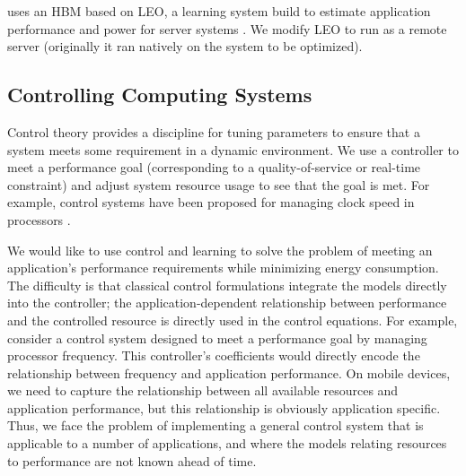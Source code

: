


\SYSTEM{} uses an HBM based on LEO, a learning system build to
estimate application performance and power for server systems
\cite{LEO}.  We modify LEO to run as a remote server (originally it
ran natively on the system to be optimized). 





\subsection{Controlling Computing Systems}

Control theory provides a discipline for tuning parameters to ensure
that a system meets some requirement in a dynamic environment.  We use
a controller to meet a performance goal (corresponding to a
quality-of-service or real-time constraint) and adjust system resource
usage to see that the goal is met.  For example, control systems have
been proposed for managing clock speed in processors \cite{lefurgy}.


We would like to use control and learning to solve the problem of
meeting an application's performance requirements while minimizing
energy consumption.  The difficulty is that classical control
formulations integrate the models directly into the controller; \ie
the application-dependent relationship between performance and the
controlled resource is directly used in the control equations.  For
example, consider a control system designed to meet a performance goal
by managing processor frequency.  This controller's coefficients would
directly encode the relationship between frequency and application
performance.  On mobile devices, we need to capture the relationship
between all available resources and application performance, but this
relationship is obviously application specific.  Thus, we face the
problem of implementing a general control system that is applicable to
a number of applications, and where the models relating resources to
performance are not known ahead of time.

